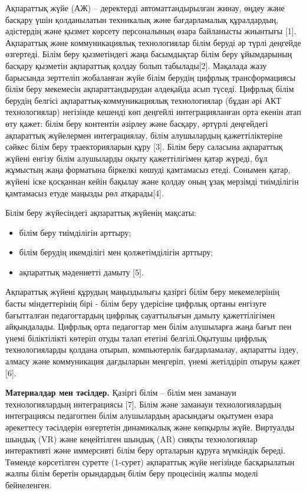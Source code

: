 \begin{multicols}{2}
Ақпараттық жүйе (АЖ) -- деректерді автоматтандырылған жинау, өңдеу және
басқару үшін қолданылатын техникалық және бағдарламалық құралдардың,
әдістердің және қызмет көрсету персоналының өзара байланысты жиынтығы
{[}1{]}. Ақпараттық және коммуникациялық технологиялар білім беруді әр
түрлі деңгейде өзгертеді. Білім беру қызметіндегі жаңа басымдықтар білім
беру ұйымдарының басқару қызметін ақпараттық қолдау болып
табылады{[}2{]}. Мақалада жазу барысында зерттеліп жобаланған жүйе білім
берудің цифрлық трансформациясы білім беру мекемесін ақпараттандырудан
әлдеқайда асып түседі. Цифрлық білім берудің белгісі
ақпараттық-коммуникациялық технологиялар (бұдан әрі АКТ технологиялар)
негізінде кешенді көп деңгейлі интеграцияланған орта екенін атап өту
қажет: білім беру контентін әзірлеу және басқару, әртүрлі деңгейдегі
ақпараттық жүйелермен интеграциялау, білім алушылардың қажеттіліктеріне
сәйкес білім беру траекторияларын құру {[}3{]}. Білім беру саласына
ақпараттық жүйені енгізу білім алушыларды оқыту қажеттілігімен қатар
жүреді, бұл жұмыстың жаңа форматына біркелкі көшуді қамтамасыз етеді.
Сонымен қатар, жүйені іске қосқаннан кейін бақылау және қолдау оның ұзақ
мерзімді тиімділігін қамтамасыз етуде маңызды рөл атқарады{[}4{]}.

Білім беру жүйесіндегі ақпараттық жүйенің мақсаты:

\begin{itemize}
\item
  білім беру тиімділігін арттыру;
\item
  білім берудің икемділігі мен қолжетімділігін арттыру;
\item
  ақпараттық мәдениетті дамыту {[}5{]}.
\end{itemize}

Ақпараттық жүйені құрудың маңыздылығы қазіргі білім беру мекемелерінің
басты міндеттерінің бірі - білім беру үдерісіне цифрлық ортаны енгізуге
бағытталған педагогтардың цифрлық сауаттылығын дамыту қажеттілігімен
айқындалады. Цифрлық орта педагогтар мен білім алушыларға жаңа бағыт пен
үнемі біліктілікті көтеріп отуды талап ететіні белгілі.Оқытушы цифрлық
технологияларды қолдана отырып, компьютерлік бағдарламалау, ақпаратты
іздеу, алмасу және коммуникация дағдыларын меңгеріп, үнемі жетілдіріп
отыруы қажет {[}6{]}.

{\bfseries Материалдар мен тәсілдер.} Қазіргі білім -- білім мен заманауи
технологиялардың интеграциясы {[}7{]}. Білім және заманауи
технологиялардың интеграциясы педагогпен білім алушылардың арасындағы
оқытумен өзара әрекеттесу тәсілдерін өзгертетін динамикалық және
көпқырлы жүйе. Виртуалды шындық (VR) және кеңейтілген шындық (AR) сияқты
технологиялар интерактивті және иммерсивті білім беру орталарын құруға
мүмкіндік береді. Төменде көрсетілген суретте (1-сурет) ақпараттық жүйе
негізінде басқарылатын жалпы білім беретін орындардың білім беру
процесінің жалпы моделі бейнеленген.


\end{multicols}
